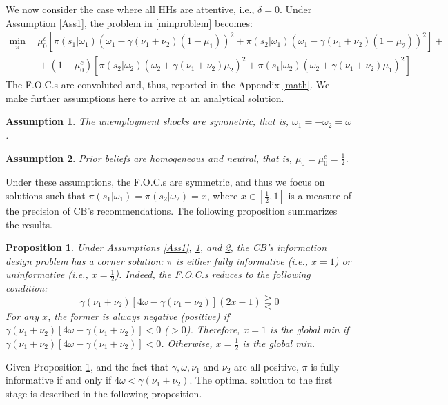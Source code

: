 \documentclass[12pt,a4paper]{article}
\newtheorem{assumption}{Assumption}
\newtheorem{proposition}{Proposition}
\begin{document}
We now consider the case where all HHs are attentive, i.e., $\delta=0$. Under Assumption \ref{Ass1}, the problem in \eqref{minproblem} becomes:
\begin{equation}
\begin{split}
    \min_{\pi} \ & \ \mu_0^c\left[\pi(s_1|\omega_1)(\omega_1-\gamma (\nu_1+\nu_2) (1-\mu_1))^2+\pi(s_2|\omega_1)(\omega_1-\gamma (\nu_1+\nu_2) (1-\mu_2))^2\right]+ \\
    \ & \ +(1-\mu_0^c)\left[\pi(s_2|\omega_2)(\omega_2+\gamma (\nu_1+\nu_2) \mu_2)^2+\pi(s_1|\omega_2)(\omega_2+\gamma (\nu_1+\nu_2) \mu_1)^2 \right]
    \end{split}
\end{equation}
The F.O.C.s are convoluted and, thus, reported in the Appendix \ref{math}. We make further assumptions here to arrive at an analytical solution.
\begin{assumption}
\label{Ass3}
    The unemployment shocks are symmetric, that is, $\omega_1=-\omega_2=\omega$.
\end{assumption}
\begin{assumption}
\label{Ass4}
    Prior beliefs are homogeneous and neutral, that is, $\mu_0=\mu_0^c=\frac{1}{2}$.
\end{assumption}
Under these assumptions, the F.O.C.s are symmetric, and thus we focus on solutions such that $\pi(s_1|\omega_1)=\pi(s_2|\omega_2)=x$, where $x\in\left[\frac{1}{2},1\right]$ is a measure of the precision of CB's recommendations. The following proposition summarizes the results.
\begin{proposition}
    \label{Prop1}
    Under Assumptions \ref{Ass1}, \ref{Ass3}, and \ref{Ass4}, the CB's information design problem has a corner solution: $\pi$ is either fully informative (i.e., $x=1$) or uninformative (i.e., $x=\frac{1}{2}$). Indeed, the F.O.C.s reduces to the following condition:
    \begin{equation}
        \gamma(\nu_1+\nu_2)[4\omega-\gamma(\nu_1+\nu_2)](2x-1)\gtreqqless 0
    \end{equation}
    For any $x$, the former is always negative (positive) if $\gamma(\nu_1+\nu_2)[4\omega-\gamma(\nu_1+\nu_2)]<0$ ($>0$). Therefore, $x=1$ is the global min if $\gamma(\nu_1+\nu_2)[4\omega-\gamma(\nu_1+\nu_2)]<0$. Otherwise, $x=\frac{1}{2}$ is the global min.
\end{proposition} 
Given Proposition \ref{Prop1}, and the fact that $\gamma,\omega,\nu_1$ and $\nu_2$ are all positive, $\pi$ is fully informative if and only if $4\omega<\gamma(\nu_1+\nu_2)$. The optimal solution to the first stage is described in the following proposition.
\end{document}
